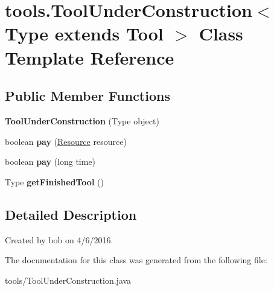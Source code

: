 \hypertarget{classtools_1_1_tool_under_construction}{}\section{tools.\+Tool\+Under\+Construction$<$ Type extends Tool $>$ Class Template Reference}
\label{classtools_1_1_tool_under_construction}
\subsection*{Public Member Functions}
\begin{DoxyCompactItemize}
\item 
{\bfseries Tool\+Under\+Construction} (Type object)\hypertarget{classtools_1_1_tool_under_construction_a237bc754485389ac444787edcb9c7617}{}\label{classtools_1_1_tool_under_construction_a237bc754485389ac444787edcb9c7617}

\item 
boolean {\bfseries pay} (\hyperlink{classuniverse_1_1_resource}{Resource} resource)\hypertarget{classtools_1_1_tool_under_construction_a7bce49dd30d9056ab406574af7d46b23}{}\label{classtools_1_1_tool_under_construction_a7bce49dd30d9056ab406574af7d46b23}

\item 
boolean {\bfseries pay} (long time)\hypertarget{classtools_1_1_tool_under_construction_a5bf5e900fd50b7b6371b8c991535cba1}{}\label{classtools_1_1_tool_under_construction_a5bf5e900fd50b7b6371b8c991535cba1}

\item 
Type {\bfseries get\+Finished\+Tool} ()\hypertarget{classtools_1_1_tool_under_construction_aca590a8af7612a410e619a59c4b75bf3}{}\label{classtools_1_1_tool_under_construction_aca590a8af7612a410e619a59c4b75bf3}

\end{DoxyCompactItemize}


\subsection{Detailed Description}
Created by bob on 4/6/2016. 

The documentation for this class was generated from the following file\+:\begin{DoxyCompactItemize}
\item 
tools/Tool\+Under\+Construction.\+java\end{DoxyCompactItemize}
